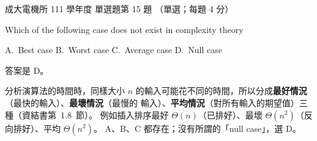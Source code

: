 \begin{pastexam}[label={px:ncku-111-ee-ds-15}]{成大電機所 111 學年度 單選題第 15 題}
（單選；每題 4 分）

Which of the following case does not exist in complexity theory

A.~Best case \qquad B.~Worst case \qquad C.~Average case \qquad D.~Null case
\end{pastexam}

\begin{pastsoln}
答案是 D。

分析演算法的時間時，同樣大小 $n$ 的輸入可能花不同的時間，所以分成\textbf{最好情況}（最快的輸入）、\textbf{最壞情況}（最慢的
輸入）、\textbf{平均情況}（對所有輸入的期望值）三種（資結書第~1.8~節）。 例如插入排序最好 $\Theta(n)$（已排好）、最壞
$\Theta(n^2)$（反向排好）、平均 $\Theta(n^2)$。 A、B、C 都存在；沒有所謂的「null case」，選 D。
\end{pastsoln}
